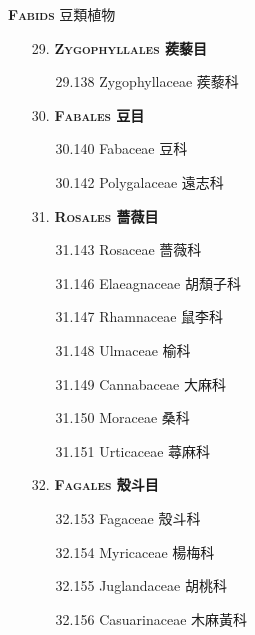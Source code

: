 \vspace{2ex} 
\noindent \normalsize\textsc{\textbf{Fabids} 豆類植物}\selectfont \\
\footnotesize\selectfont
\begin{enumerate}
  \item[29. ] \textbf{\textsc{Zygophyllales} 蒺藜目} 
    \begin{enumerate}
      \item[29.138] Zygophyllaceae 蒺藜科  
        
    \end{enumerate}
  \item[30. ] \textbf{\textsc{Fabales} 豆目} 
    \begin{enumerate}
      \item[30.140] Fabaceae 豆科  
        
      \item[30.142] Polygalaceae 遠志科  
        
    \end{enumerate}
  \item[31. ] \textbf{\textsc{Rosales} 薔薇目} 
    \begin{enumerate}
      \item[31.143] Rosaceae 薔薇科  
        
      \item[31.146] Elaeagnaceae 胡頹子科  
        
      \item[31.147] Rhamnaceae 鼠李科  
        
      \item[31.148] Ulmaceae 榆科  
        
      \item[31.149] Cannabaceae 大麻科  
        
      \item[31.150] Moraceae 桑科  
        
      \item[31.151] Urticaceae 蕁麻科  
        
    \end{enumerate}
  \item[32. ] \textbf{\textsc{Fagales} 殼斗目} 
    \begin{enumerate}
      \item[32.153] Fagaceae 殼斗科  
        
      \item[32.154] Myricaceae 楊梅科  
        
      \item[32.155] Juglandaceae 胡桃科  
        
      \item[32.156] Casuarinaceae 木麻黃科  
        

\end{enumerate}
\end{enumerate}
